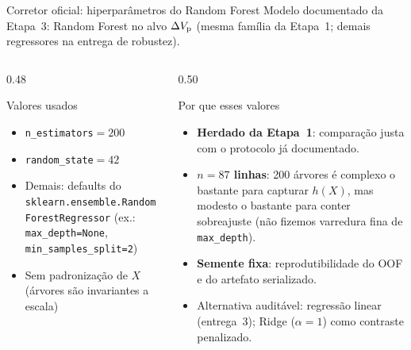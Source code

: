 \documentclass[aspectratio=169,10pt]{beamer}
\begin{document}
\begin{frame}{Corretor oficial: hiperparâmetros do Random Forest}
  \footnotesize
  Modelo documentado da Etapa~3: Random Forest no alvo $\Delta V_{\mathrm{p}}$
  (mesma família da Etapa~1; demais regressores na entrega de robustez).
  \vspace{0.08cm}
  \begin{columns}[T,onlytextwidth]
    \begin{column}{0.48\textwidth}
      \begin{block}{Valores usados}
        \scriptsize
        \begin{itemize}\setlength{\itemsep}{0.12em}
          \item \texttt{n\_estimators}${}=200$
          \item \texttt{random\_state}${}=42$
          \item Demais: defaults do
                \texttt{sklearn.ensemble.RandomForestRegressor}
                (ex.: \texttt{max\_depth=None},
                \texttt{min\_samples\_split=2})
          \item Sem padronização de $X$ (árvores são invariantes a escala)
        \end{itemize}
      \end{block}
    \end{column}
    \begin{column}{0.50\textwidth}
      \begin{exampleblock}{Por que esses valores}
        \scriptsize
        \begin{itemize}\setlength{\itemsep}{0.12em}
          \item \textbf{Herdado da Etapa~1}: comparação justa com o
                protocolo já documentado.
          \item \textbf{$n=87$ linhas}: 200 árvores é complexo o bastante
                para capturar $h(X)$, mas modesto o bastante para conter
                sobreajuste (não fizemos varredura fina de
                \texttt{max\_depth}).
          \item \textbf{Semente fixa}: reprodutibilidade do OOF e do
                artefato serializado.
          \item Alternativa auditável: regressão linear (entrega~3);
                Ridge ($\alpha=1$) como contraste penalizado.
        \end{itemize}
      \end{exampleblock}
    \end{column}
  \end{columns}
\end{frame}
\end{document}
